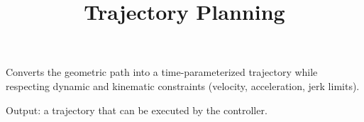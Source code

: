 \documentclass[a4paper]{article}
\title{Trajectory Planning}
\date{}
\begin{document}
    \maketitle
    Converts the geometric path into a time-parameterized trajectory while respecting dynamic and kinematic constraints (velocity, acceleration, jerk limits).
    
    Output: a trajectory that can be executed by the controller.
\end{document}

